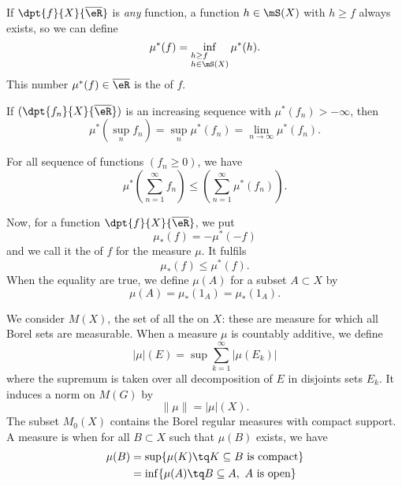 If $\dpt{f}{X}{\overline{ \eR }}$ is \emph{any} function, a function $h\in\mS(X)$ with $h\geq f$ always exists, so we can define
\begin{equation}
	\mu^*(f)=\inf_{%
		\begin{subarray}{l}
			h\geq f\\
			h\in\mS(X)
		\end{subarray}
	} \mu^*(h).
\end{equation}
This number $\mu^*(f)\in\overline{ \eR }$ is the  of $f$.


\begin{proposition}
	If $(\dpt{f_n}{X}{\overline{ \eR }})$ is an increasing sequence with $\mu^*(f_n)>-\infty$, then
	\[
		\mu^*(\sup_nf_n)=\sup_n\mu^*(f_n)=\lim_{n\to\infty}\mu^*(f_n).
	\]

\end{proposition}

\begin{proposition}
	For all sequence of functions $(f_n\geq 0)$, we have
	\[
		\mu^*\left( \sum_{n=1}^{\infty}f_n\right)\leq\left(\sum_{n=1}^{\infty}\mu^*(f_n) \right).
	\]

\end{proposition}

Now, for a function $\dpt{f}{X}{\overline{ \eR }}$, we put
\begin{equation}
	\mu_*(f)=-\mu^*(-f)
\end{equation}
and we call it the  of $f$ for the measure $\mu$. It fulfils
\[
	\mu_*(f)\leq\mu^*(f).
\]
When the equality are true, we define $\mu(A)$ for a subset $A\subset X$ by
\begin{equation}
	\mu(A)=\mu_*(1_A)=\mu_*(1_A).
\end{equation}

We consider $M(X)$\label{defMX}, the set of all the  on $X$: these are measure for which all Borel sets are measurable. When a measure $\mu$ is countably additive, we define
\begin{equation}
	| \mu |(E)=\sup \sum_{k=1}^{\infty}| \mu(E_k) |
\end{equation}
where the supremum is taken over all decomposition of $E$ in disjoints sets $E_k$. It induces a norm on $M(G)$ by
\[
	\| \mu \|=| \mu |(X).
\]
The subset  $M_0(X)$\label{defMzX} contains the Borel regular measures with compact support. A measure is  when for all $B\subset X$ such that $\mu(B)$ exists, we have
\begin{equation}
	\begin{split}
		\mu(B) & =\sup\{ \mu(K)\tq K\subseteq B \textrm{ is compact} \}   \\
		       & =\inf\{ \mu(A)\tq B\subseteq A, \textrm{ $A$ is open} \}
	\end{split}
\end{equation}

